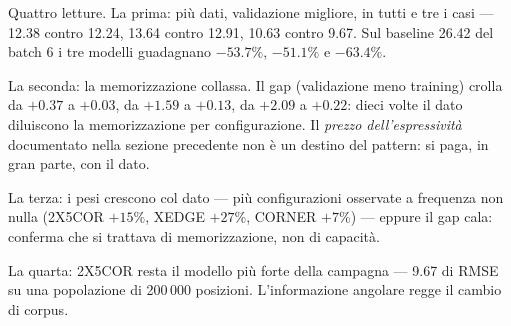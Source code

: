 Quattro letture. La prima: più dati, validazione migliore, in tutti e
tre i casi — 12.38 contro 12.24, 13.64 contro 12.91, 10.63 contro
9.67. Sul baseline 26.42 del batch 6 i tre modelli guadagnano
$-53.7\%$, $-51.1\%$ e $-63.4\%$.

La seconda: la memorizzazione collassa. Il gap (validazione meno
training) crolla da $+0.37$ a $+0.03$, da $+1.59$ a $+0.13$, da
$+2.09$ a $+0.22$: dieci volte il dato diluiscono la memorizzazione
per configurazione. Il \emph{prezzo dell'espressività} documentato
nella sezione precedente non è un destino del pattern: si paga, in
gran parte, con il dato.

La terza: i pesi crescono col dato — più configurazioni osservate a
frequenza non nulla (2X5COR $+15\%$, XEDGE $+27\%$, CORNER $+7\%$) —
eppure il gap cala: conferma che si trattava di memorizzazione, non
di capacità.

La quarta: 2X5COR resta il modello più forte della campagna — 9.67 di
RMSE su una popolazione di 200\,000 posizioni. L'informazione
angolare regge il cambio di corpus.

